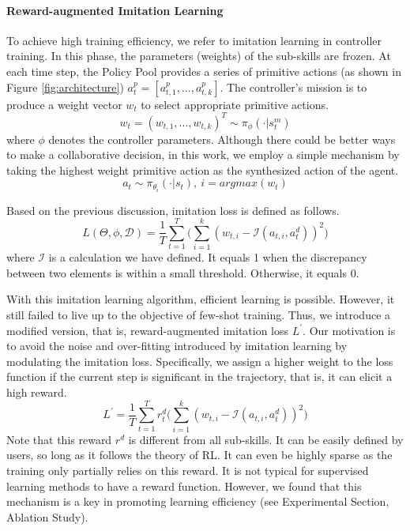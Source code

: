 \documentclass[conference]{IEEEtran}
\begin{document}
\paragraph{Reward-augmented Imitation Learning} To achieve high training efficiency, we refer to imitation learning in controller training. In this phase, the parameters (weights) of the sub-skills are frozen. At each time step, the Policy Pool provides a series of primitive actions (as shown in Figure \ref{fig:architecture}) $a^{p}_{t} = [a^{p}_{t,1},..., a^{p}_{t,k}]$. The controller's mission is to produce a weight vector $w_t$ to select appropriate primitive actions.
\begin{equation}
    w_{t}=(w_{t,1},...,w_{t,k})^T\sim\pi_\phi(\cdot|s_{t}^{m})
\label{eq:1}
\end{equation}
where $\phi$ denotes the controller parameters. Although there could be better ways to make a collaborative decision, in this work, we employ a simple mechanism by taking the highest weight primitive action as the synthesized action of the agent.
\begin{equation}
    a_t\sim\pi_{\theta_{i}}(\cdot|s_t),\ i=argmax(w_t)
\end{equation}

Based on the previous discussion, imitation loss is defined as follows.
\begin{equation}
    L(\Theta,\phi,\mathcal{D})=
\frac{1}{T}\sum^T_{t=1} \big( \sum^k_{i=1}(w_{t,i}-\mathcal{I}(a_{t,i},a_{t}^{d}))^2 \big)
\end{equation}
where $\mathcal{I}$ is a calculation we have defined. It equals 1 when the discrepancy between two elements is within a small threshold. Otherwise, it equals 0.

With this imitation learning algorithm, efficient learning is possible. However, it still failed to live up to the objective of few-shot training. Thus, we introduce a modified version, that is, reward-augmented imitation loss $L^{'}$. Our motivation is to avoid the noise and over-fitting introduced by imitation learning by modulating the imitation loss. Specifically, we assign a higher weight to the loss function if the current step is significant in the trajectory, that is, it can elicit a high reward. 
\begin{equation}
    L^{'}=
\frac{1}{T}\sum^T_{t=1} r_{t}^{d} \big( \sum^k_{i=1}(w_{t,i}-\mathcal{I}(a_{t,i},a_{t}^{d}))^2 \big)
\end{equation}
Note that this reward $r^{d}$ is different from all sub-skills. It can be easily defined by users, so long as it follows the theory of RL. It can even be highly sparse as the training only partially relies on this reward. It is not typical for supervised learning methods to have a reward function. However, we found that this mechanism is a key in promoting learning efficiency (see Experimental Section, Ablation Study).
\end{document}
